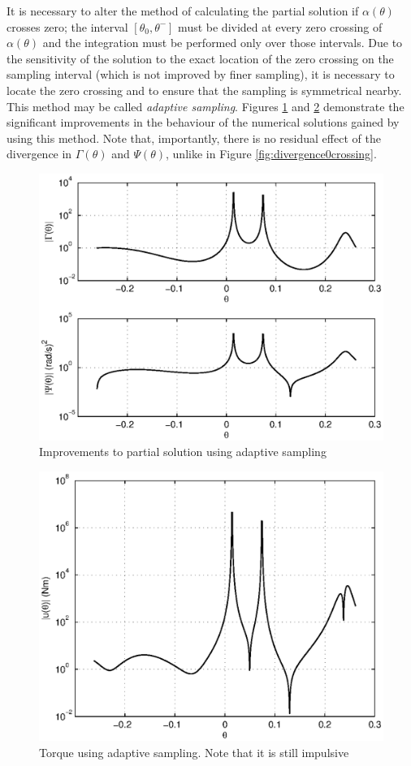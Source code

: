  It is necessary to alter the method of calculating the partial solution if $\alpha(\theta)$ crosses zero; the interval $[\theta_0, \theta^-]$ must be divided at every zero crossing of $\alpha(\theta)$ and the integration must be performed only over those intervals. Due to the sensitivity of the solution to the exact location of the zero crossing on the sampling interval (which is not improved by finer sampling), it is necessary to locate the zero crossing and to ensure that the sampling is symmetrical nearby. This method may be called \textit{adaptive sampling}. Figures \ref{fig:betterGamPsi} and \ref{fig:bettertorque} demonstrate the significant improvements in the behaviour of the numerical solutions gained by using this method. Note that, importantly, there is no residual effect of the divergence in $\Gamma(\theta)$ and $\Psi(\theta)$, unlike in Figure \ref{fig:divergence0crossing}.
 
 \begin{figure}
 	\centering
 	\includegraphics[width=0.8\linewidth]{4VirtConstLib/betterGamPsi}
 	\caption{Improvements to partial solution using adaptive sampling}
 	\label{fig:betterGamPsi}
 \end{figure}
 
  \begin{figure}
  	\centering
  	\includegraphics[width=0.8\linewidth]{4VirtConstLib/betterTorque}
  	\caption[Torque using adaptive sampling]{Torque using adaptive sampling. Note that it is still impulsive}
  	\label{fig:bettertorque}
  \end{figure}
  
